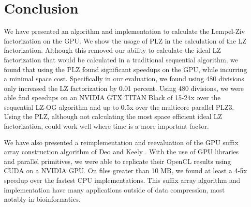 \chapter{Conclusion}
\label{chap:conclusion}

We have presented an algorithm and implementation to calculate the Lempel-Ziv factorization on the GPU.
We show the usage of PLZ in the calculation of the LZ factorization.
Although this removed our ability to calculate the ideal LZ factorization that would be calculated in a traditional sequential algorithm, we found that using the PLZ found significant speedups on the GPU, while incurring a minimal space cost.
Specifically in our evaluation, we found using 480 divisions only increased the LZ factorization by 0.01 percent.
Using 480 divisions, we were able find speedups on an NVIDIA GTX TITAN Black of 15-24x over the sequential LZ-OG algorithm and up to 0.5x over the multicore parallel PLZ3.
Using the PLZ, although not calculating the most space efficient ideal LZ factorization, could work well where time is a more important factor.

We have also presented a reimplementation and reevaluation of the GPU suffix array construction algorithm of Deo and Keely \cite{Deo}.
With the use of GPU libraries and parallel primitives, we were able to replicate their OpenCL results using CUDA on a NVIDIA GPU.
On files greater than 10 MB, we found at least a 4-5x speedup over the fastest CPU implementations.
This suffix array algorithm and implementation have many applications outside of data compression, most notably in bioinformatics.
